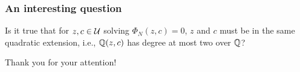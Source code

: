 \documentclass[aspectratio=1610]{beamer}
\begin{document}
\begin{frame}
  \frametitle{An interesting question}

  \pause

  \begin{question}
    \label{q:z-c-same-extension}
    Is it true that for $z, c \in \mathcal{U}$ solving $\Phi_N(z, c) = 0$, $z$
    and $c$ must be in the same quadratic extension, i.e., $\mathbb{Q}(z, c)$
    has degree at most two over $\mathbb{Q}$?
  \end{question}
\end{frame}

\begin{frame}
  \center
  \Huge{Thank you for your attention!}
\end{frame}

{}

\end{document}
